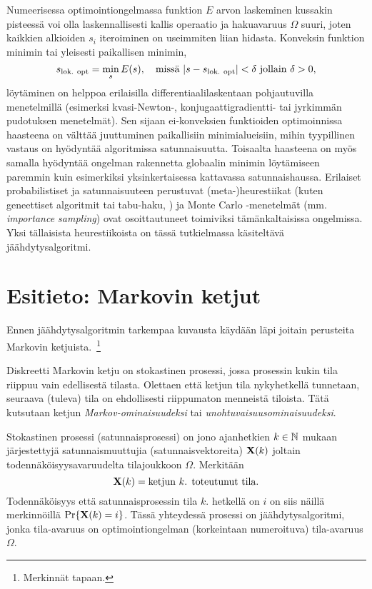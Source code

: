 Numeerisessa optimointiongelmassa funktion $E$ arvon laskeminen kussakin pisteessä voi olla laskennallisesti kallis operaatio ja hakuavaruus $\Omega$ suuri,
joten kaikkien alkioiden $s_i$ iteroiminen on useimmiten liian hidasta.
Konveksin funktion minimin tai yleisesti paikallisen minimin,
\begin{equation}
    s_\text{lok. opt} = \min_s E(s), \quad \text{missä } \lvert s - s_{\text{lok. opt}}\rvert < \delta \text{ jollain } \delta > 0,
\end{equation}
löytäminen on helppoa erilaisilla differentiaalilaskentaan pohjautuvilla menetelmillä
(esimerksi kvasi-Newton-, konjugaattigradientti- tai jyrkimmän pudotuksen menetelmät).
Sen sijaan ei-konveksien funktioiden optimoinnissa haasteena on välttää juuttuminen paikallisiin minimialueisiin,
mihin tyypillinen vastaus on hyödyntää algoritmissa satunnaisuutta.
Toisaalta haasteena on myös samalla hyödyntää ongelman rakennetta globaalin minimin löytämiseen paremmin kuin esimerkiksi yksinkertaisessa kattavassa satunnaishaussa.
Erilaiset probabilistiset ja satunnaisuuteen perustuvat (meta-)heurestiikat (kuten geneettiset algoritmit tai tabu-haku, \cite[ks. esim.][]{glover03}) ja Monte Carlo -menetelmät (mm. \emph{importance sampling}) ovat osoittautuneet toimiviksi tämänkaltaisissa ongelmissa.
Yksi tällaisista heurestiikoista on tässä tutkielmassa käsiteltävä jäähdytysalgoritmi.
\cite{salamonetal}

\section{Esitieto: Markovin ketjut}
\label{sec:esitieto_markovin_ketjut}

Ennen jäähdytysalgoritmin tarkempaa kuvausta käydään läpi joitain perusteita Markovin ketjuista.~\footnote{Merkinnät \cite{laarhoven} tapaan.}

Diskreetti Markovin ketju on stokastinen prosessi, jossa prosessin kukin tila riippuu vain edellisestä tilasta.
Olettaen että ketjun tila nykyhetkellä tunnetaan, seuraava (tuleva) tila on ehdollisesti riippumaton menneistä tiloista.
Tätä kutsutaan ketjun \emph{Markov-ominaisuudeksi} tai \emph{unohtuvaisuusominaisuudeksi}.

\begin{maar}
    Stokastinen prosessi (satunnaisprosessi) on jono ajanhetkien $k \in \mathbb{N}$ mukaan järjestettyjä satunnaismuuttujia (satunnaisvektoreita) $\mathbf{X}(k)$ joltain todennäköisyysavaruudelta tilajoukkoon $\Omega$.
    Merkitään
    \begin{equation}
        \mathbf{X}(k) = \text{ketjun $k$. toteutunut tila}.
    \end{equation}
    Todennäköisyys että satunnaisprosessin tila $k$. hetkellä on $i$ on siis näillä merkinnöillä $\Pr\{ \mathbf{X}(k) = i\}$.
    Tässä yhteydessä prosessi on jäähdytysalgoritmi, jonka tila-avaruus on optimointiongelman (korkeintaan numeroituva) tila-avaruus $\Omega$.
\end{maar}

